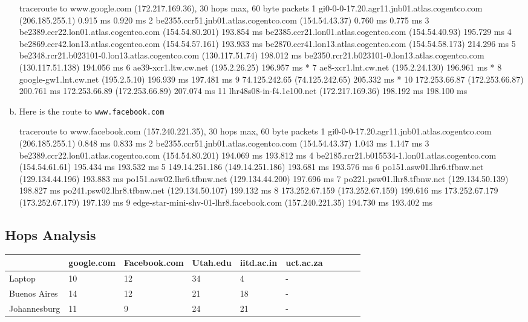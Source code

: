 \begin{enumerate}[a.]
\begin{code}
traceroute to www.google.com (172.217.169.36), 30 hops max, 60 byte packets
 1  gi0-0-0-17.20.agr11.jnb01.atlas.cogentco.com (206.185.255.1)  0.915 ms  0.920 ms
 2  be2355.ccr51.jnb01.atlas.cogentco.com (154.54.43.37)  0.760 ms  0.775 ms
 3  be2389.ccr22.lon01.atlas.cogentco.com (154.54.80.201)  193.854 ms be2385.ccr21.lon01.atlas.cogentco.com (154.54.40.93)  195.729 ms
 4  be2869.ccr42.lon13.atlas.cogentco.com (154.54.57.161)  193.933 ms be2870.ccr41.lon13.atlas.cogentco.com (154.54.58.173)  214.296 ms
 5  be2348.rcr21.b023101-0.lon13.atlas.cogentco.com (130.117.51.74)  198.012 ms be2350.rcr21.b023101-0.lon13.atlas.cogentco.com (130.117.51.138)  194.056 ms
 6  ae39-xcr1.ltw.cw.net (195.2.26.25)  196.957 ms *
 7  ae8-xcr1.lnt.cw.net (195.2.24.130)  196.961 ms *
 8  google-gw1.lnt.cw.net (195.2.5.10)  196.939 ms  197.481 ms
 9  74.125.242.65 (74.125.242.65)  205.332 ms *
10  172.253.66.87 (172.253.66.87)  200.761 ms 172.253.66.89 (172.253.66.89)  207.074 ms
11  lhr48s08-in-f4.1e100.net (172.217.169.36)  198.192 ms  198.100 ms
\end{code}
\clearpage
\item Here is the route to {\tt www.facebook.com}
\begin{code}
traceroute to www.facebook.com (157.240.221.35), 30 hops max, 60 byte packets
 1  gi0-0-0-17.20.agr11.jnb01.atlas.cogentco.com (206.185.255.1)  0.848 ms  0.833 ms
 2  be2355.ccr51.jnb01.atlas.cogentco.com (154.54.43.37)  1.043 ms  1.147 ms
 3  be2389.ccr22.lon01.atlas.cogentco.com (154.54.80.201)  194.069 ms  193.812 ms
 4  be2185.rcr21.b015534-1.lon01.atlas.cogentco.com (154.54.61.61)  195.434 ms  193.532 ms
 5  149.14.251.186 (149.14.251.186)  193.681 ms  193.576 ms
 6  po151.asw01.lhr6.tfbnw.net (129.134.44.196)  193.883 ms po151.asw02.lhr6.tfbnw.net (129.134.44.200)  197.696 ms
 7  po221.psw01.lhr8.tfbnw.net (129.134.50.139)  198.827 ms po241.psw02.lhr8.tfbnw.net (129.134.50.107)  199.132 ms
 8  173.252.67.159 (173.252.67.159)  199.616 ms 173.252.67.179 (173.252.67.179)  197.139 ms
 9  edge-star-mini-shv-01-lhr8.facebook.com (157.240.221.35)  194.730 ms  193.402 ms
\end{code}
\end{enumerate}

\subsection*{Hops Analysis}

\begin{table}[!ht]
    \centering
    \begin{tabular}{|l|l|l|l|l|l|l|l|l|l|}
    \hline
        ~ & google.com & Facebook.com & Utah.edu & iitd.ac.in & uct.ac.za  \\ \hline
        Laptop & 10 & 12 & 34 & 4 & - \\ \hline
        Buenos Aires & 14 & 12 & 21 & 18 & - \\ \hline
        Johannesburg & 11 & 9 & 24 & 21 & -  \\ \hline
    \end{tabular}
\end{table}

